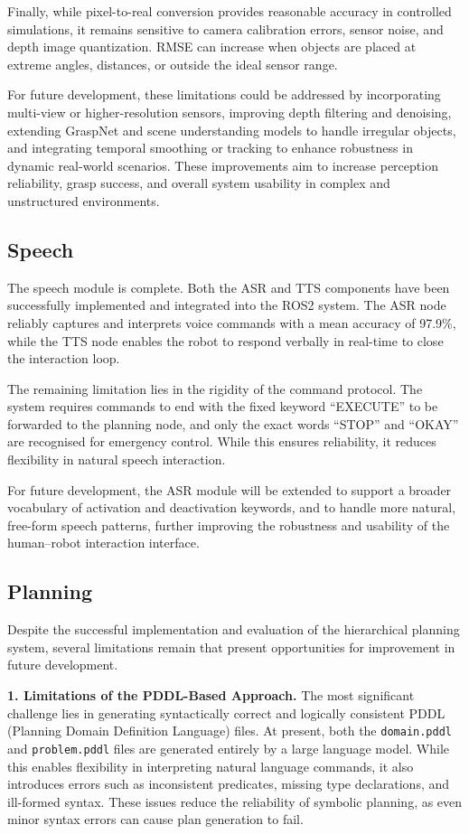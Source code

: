 \documentclass[12pt]{extarticle}
\begin{document}
Finally, while pixel-to-real conversion provides reasonable accuracy in controlled simulations, it remains sensitive to camera calibration errors, sensor noise, and depth image quantization. RMSE can increase when objects are placed at extreme angles, distances, or outside the ideal sensor range. 

For future development, these limitations could be addressed by incorporating multi-view or higher-resolution sensors, improving depth filtering and denoising, extending GraspNet and scene understanding models to handle irregular objects, and integrating temporal smoothing or tracking to enhance robustness in dynamic real-world scenarios. These improvements aim to increase perception reliability, grasp success, and overall system usability in complex and unstructured environments.

\subsection{Speech}

The speech module is complete. Both the ASR and TTS components have been successfully implemented and integrated into the ROS2 system. The ASR node reliably captures and interprets voice commands with a mean accuracy of 97.9\%, while the TTS node enables the robot to respond verbally in real-time to close the interaction loop.

The remaining limitation lies in the rigidity of the command protocol. The system requires commands to end with the fixed keyword ``EXECUTE'' to be forwarded to the planning node, and only the exact words ``STOP'' and ``OKAY'' are recognised for emergency control. While this ensures reliability, it reduces flexibility in natural speech interaction.

For future development, the ASR module will be extended to support a broader vocabulary of activation and deactivation keywords, and to handle more natural, free-form speech patterns, further improving the robustness and usability of the human–robot interaction interface.
\subsection{Planning}
Despite the successful implementation and evaluation of the hierarchical planning system, several limitations remain that present opportunities for improvement in future development.

\textbf{1. Limitations of the PDDL-Based Approach.}
The most significant challenge lies in generating syntactically correct and logically consistent PDDL (Planning Domain Definition Language) files. At present, both the \texttt{domain.pddl} and \texttt{problem.pddl} files are generated entirely by a large language model. While this enables flexibility in interpreting natural language commands, it also introduces errors such as inconsistent predicates, missing type declarations, and ill-formed syntax. These issues reduce the reliability of symbolic planning, as even minor syntax errors can cause plan generation to fail.
\end{document}
